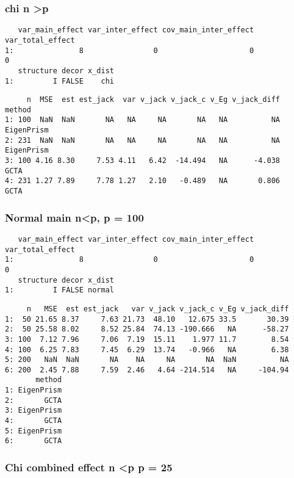 \documentclass[]{article}
\begin{document}
\subsubsection{chi n \textgreater{}p}\label{chi-n-p}

\begin{verbatim}
   var_main_effect var_inter_effect cov_main_inter_effect var_total_effect
1:               8                0                     0                0
   structure decor x_dist
1:         I FALSE    chi
\end{verbatim}

\begin{verbatim}
     n  MSE  est est_jack  var v_jack v_jack_c v_Eg v_jack_diff     method
1: 100  NaN  NaN       NA   NA     NA       NA   NA          NA EigenPrism
2: 231  NaN  NaN       NA   NA     NA       NA   NA          NA EigenPrism
3: 100 4.16 8.30     7.53 4.11   6.42  -14.494   NA      -4.038       GCTA
4: 231 1.27 7.89     7.78 1.27   2.10   -0.489   NA       0.806       GCTA
\end{verbatim}

\subsubsection{Normal main n\textless{}p, p =
100}\label{normal-main-np-p-100}

\begin{verbatim}
   var_main_effect var_inter_effect cov_main_inter_effect var_total_effect
1:               8                0                     0                0
   structure decor x_dist
1:         I FALSE normal
\end{verbatim}

\begin{verbatim}
     n   MSE  est est_jack   var v_jack v_jack_c v_Eg v_jack_diff
1:  50 21.65 8.37     7.63 21.73  48.10   12.675 33.5       30.39
2:  50 25.58 8.02     8.52 25.84  74.13 -190.666   NA      -58.27
3: 100  7.12 7.96     7.06  7.19  15.11    1.977 11.7        8.54
4: 100  6.25 7.83     7.45  6.29  13.74   -0.966   NA        6.38
5: 200   NaN  NaN       NA    NA     NA       NA  NaN          NA
6: 200  2.45 7.88     7.59  2.46   4.64 -214.514   NA     -104.94
       method
1: EigenPrism
2:       GCTA
3: EigenPrism
4:       GCTA
5: EigenPrism
6:       GCTA
\end{verbatim}

\subsubsection{Chi combined effect n \textless{}p p =
25}\label{chi-combined-effect-n-p-p-25}
\end{document}
